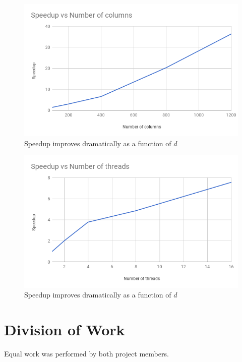 \documentclass[12pt]{article}
\begin{document}
\begin{figure}[ht]
\centering
\label{speedup-vs-cols}
\includegraphics[scale=0.7]{speedup-vs-cols}
\caption{Speedup improves dramatically as a function of $d$}
\end{figure}

\begin{figure}[ht]
\centering
\label{speedup-vs-threads}
\includegraphics[scale=0.7]{speedup-vs-threads}
\caption{Speedup improves dramatically as a function of $d$}
\end{figure}

\section{Division of Work}
Equal work was performed by both project members. 



\end{document}
